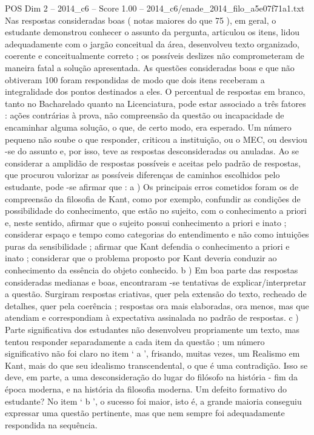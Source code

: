 \begin{textsample}{POS Dim 2 – 2014\_c6 – Score 1.00 – 2014\_c6/enade\_2014\_filo\_a5e07f71a1.txt}
Nas respostas consideradas boas ( notas maiores do que 75 ), em geral, o estudante demonstrou conhecer o assunto da pergunta, articulou os itens, lidou adequadamente com o jargão conceitual da área, desenvolveu texto organizado, coerente e conceitualmente correto ; os possíveis deslizes não comprometeram de maneira fatal a solução apresentada.
As questões consideradas boas e que não obtiveram 100 foram respondidas de modo que dois itens receberam a integralidade dos pontos destinados a eles.
O percentual de respostas em branco, tanto no Bacharelado quanto na Licenciatura, pode estar associado a três fatores : ações contrárias à prova, não compreensão da questão ou incapacidade de encaminhar alguma solução, o que, de certo modo, era esperado.
Um número pequeno não soube o que responder, criticou a instituição, ou o MEC, ou desviou -se do assunto e, por isso, teve as respostas desconsideradas ou anuladas.
Ao se considerar a amplidão de respostas possíveis e aceitas pelo padrão de respostas, que procurou valorizar as possíveis diferenças de caminhos escolhidos pelo estudante, pode -se afirmar que : a ) Os principais erros cometidos foram os de compreensão da filosofia de Kant, como por exemplo, confundir as condições de possibilidade do conhecimento, que estão no sujeito, com o conhecimento a priori e, neste sentido, afirmar que o sujeito possui conhecimento a priori e inato ; considerar espaço e tempo como categorias do entendimento e não como intuições puras da sensibilidade ; afirmar que Kant defendia o conhecimento a priori e inato ; considerar que o problema proposto por Kant deveria conduzir ao conhecimento da essência do objeto conhecido. b ) Em boa parte das respostas consideradas medianas e boas, encontraram -se tentativas de explicar/interpretar a questão.
Surgiram respostas criativas, quer pela extensão do texto, recheado de detalhes, quer pela coerência ; respostas ora mais elaboradas, ora menos, mas que atendiam e correspondiam à expectativa assinalada no padrão de respostas. c ) Parte significativa dos estudantes não desenvolveu propriamente um texto, mas tentou responder separadamente a cada item da questão ; um número significativo não foi claro no item ‘ a ’, frisando, muitas vezes, um Realismo em Kant, mais do que seu idealismo transcendental, o que é uma contradição.
Isso se deve, em parte, a uma desconsideração do lugar do filósofo na história - fim da época moderna, e na história da filosofia moderna.
Um defeito formativo do estudante?
No item ‘ b ’, o sucesso foi maior, isto é, a grande maioria conseguiu expressar uma questão pertinente, mas que nem sempre foi adequadamente respondida na sequência.

\end{textsample}
